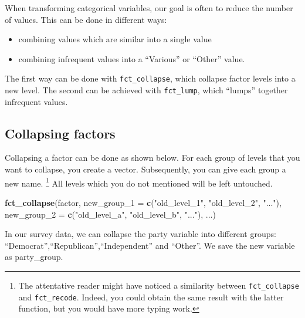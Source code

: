 \documentclass[]{tufte-book}
\newenvironment{Shaded}{}{}
\newcommand{\DataTypeTok}[1]{\textcolor[rgb]{0.56,0.13,0.00}{#1}}
\newcommand{\KeywordTok}[1]{\textcolor[rgb]{0.00,0.44,0.13}{\textbf{#1}}}
\newcommand{\NormalTok}[1]{#1}
\newcommand{\StringTok}[1]{\textcolor[rgb]{0.25,0.44,0.63}{#1}}
\providecommand{\tightlist}{%
  \setlength{\itemsep}{0pt}\setlength{\parskip}{0pt}}
\begin{document}
When transforming categorical variables, our goal is often to reduce the number of values. This can be done in different ways:

\begin{itemize}
\tightlist
\item
  combining values which are similar into a single value
\item
  combining infrequent values into a ``Various'' or ``Other'' value.
\end{itemize}

The first way can be done with \texttt{fct\_collapse}, which collapse factor levels into a new level. The second can be achieved with \texttt{fct\_lump}, which ``lumps'' together infrequent values.

\hypertarget{collapsing-factors}{%
\subsection{Collapsing factors}\label{collapsing-factors}}

Collapsing a factor can be done as shown below. For each group of levels that you want to collapse, you create a vector. Subsequently, you can give each group a new name. \footnote{The attentative reader might have noticed a similarity between \texttt{fct\_collapse} and \texttt{fct\_recode}. Indeed, you could obtain the same result with the latter function, but you would have more typing work.} All levels which you do not mentioned will be left untouched.

\begin{Shaded}
\begin{Highlighting}[]
\KeywordTok{fct_collapse}\NormalTok{(factor,}
    \DataTypeTok{new_group_1 =} \KeywordTok{c}\NormalTok{(}\StringTok{"old_level_1"}\NormalTok{, }\StringTok{"old_level_2"}\NormalTok{, }\StringTok{"..."}\NormalTok{),}
    \DataTypeTok{new_group_2 =} \KeywordTok{c}\NormalTok{(}\StringTok{"old_level_a"}\NormalTok{, }\StringTok{"old_level_b"}\NormalTok{, }\StringTok{"..."}\NormalTok{),}
\NormalTok{    ...)}
\end{Highlighting}
\end{Shaded}

In our survey data, we can collapse the party variable into different groups: ``Democrat'',``Republican'',``Independent'' and ``Other''. We save the new variable as party\_group.
\end{document}
